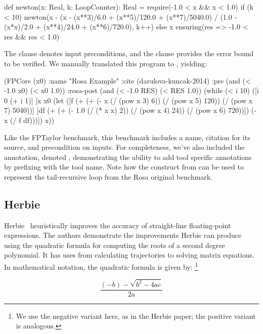 \documentclass[main.tex]{subfiles}
\begin{document}
\begin{code}
def newton(x: Real, k: LoopCounter): Real = {
  require(-1.0 < x && x < 1.0)
  if (k < 10) {
    newton(x - (x - (x**3)/6.0 + (x**5)/120.0 + (x**7)/5040.0) / 
      (1.0 - (x*x)/2.0 + (x**4)/24.0 + (x**6)/720.0), k++)
  } else {
    x
  }
} ensuring(res => -1.0 < res && res < 1.0)
\end{code}

The  clause denotes input preconditions, and the
 clause provides the error bound to be verified. We manually
translated this program to \core, yielding:

\begin{code}
(FPCore (x0)
  :name "Rosa Example"
  :cite (darulova-kuncak-2014)
  :pre (and (< -1.0 x0) (< x0 1.0))
  :rosa-post (and (< -1.0 RES) (< RES 1.0))
  (while (< i 10)
    ([i 0 (+ i 1)]
     [x x0
      (let ([f (+ (+ (- x (/ (pow x 3) 6))
                     (/ (pow x 5) 120)) (/ (pow x 7) 5040))]
            [df (+ (+ (- 1.0 (/ (* x x) 2)) 
                      (/ (pow x 4) 24)) (/ (pow x 6) 720))])
        (- x (/ f df)))])
    x))
\end{code}

Like the FPTaylor benchmark, this benchmark includes a name,
  citation for its source, and precondition on inputs.
For completeness, we've also included the  annotation,
  denoted ,
  demonstrating the ability to add tool specific annotations
  by prefixing with the tool name.
Note how the  construct from \core
  can be used to represent the tail-recursive loop
  from the Rosa original benchmark.

\subsection{Herbie}

Herbie~\cite{pavel15} heuristically improves the accuracy of straight-line
floating-point expressions.  The authors demonstrate the improvements
Herbie can produce using the quadratic formula for computing the roots of a
second degree polynomial.  It has uses from calculating trajectories to
solving matrix equations.  In mathematical notation, the quadratic formula
is given by:%
\footnote{We use the negative variant here, as in the Herbie paper;
  the positive variant is analogous.}

\begin{equation*}
  \frac{(- b) - \sqrt{b^2 - 4ac}}{2a}
\end{equation*}
\end{document}
